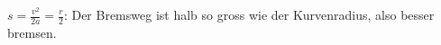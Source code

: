 $s = \frac{v^2}{2a} = \frac{r}{2}$: Der Bremsweg ist halb so gross wie der Kurvenradius, also besser bremsen.
